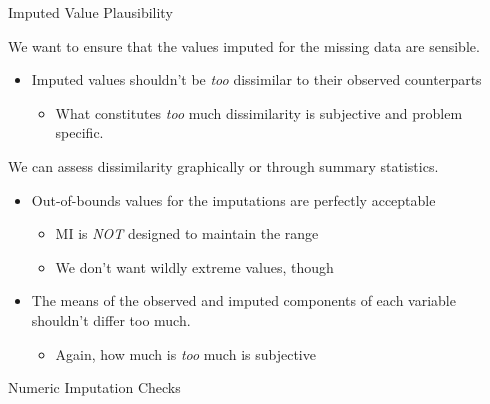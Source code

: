 \documentclass{beamer}
\begin{document}
\begin{frame}{Imputed Value Plausibility}
  
  We want to ensure that the values imputed for the missing data are
  sensible.
  \vspace{6pt}
  \begin{itemize}
  \item Imputed values shouldn't be \emph{too} dissimilar to their
    observed counterparts
    \begin{itemize}
    \item What constitutes \emph{too} much dissimilarity is
      subjective and problem specific.
    \end{itemize}
  \end{itemize}
  \vspace{6pt}
  We can assess dissimilarity graphically or through summary statistics.
  \vspace{6pt}
  \begin{itemize}
  \item Out-of-bounds values for the imputations are perfectly acceptable
    \begin{itemize}
    \item MI is \emph{NOT} designed to maintain the range 
    \item We don't want wildly extreme values, though
    \end{itemize}
    \vspace{6pt}
  \item The means of the observed and imputed components of each
    variable shouldn't differ too much.
    \begin{itemize}
    \item Again, how much is \emph{too} much is subjective
    \end{itemize}
  \end{itemize}
  
\end{frame}


\begin{frame}[allowframebreaks]{Numeric Imputation Checks}
  




\pagebreak



\end{frame}
\end{document}
